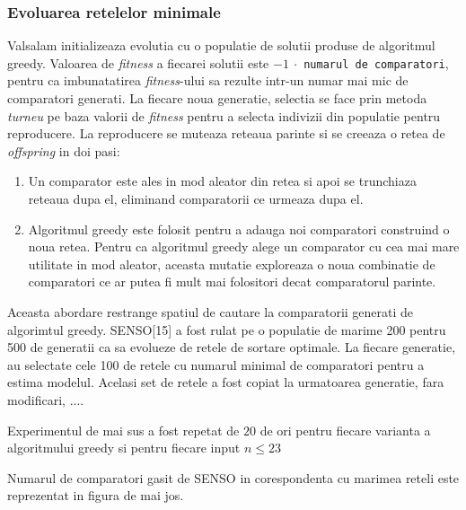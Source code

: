 \documentclass[12pt]{article}
\begin{document}
\subsubsection{Evoluarea retelelor minimale}

Valsalam initializeaza evolutia cu o populatie de solutii produse de algoritmul greedy. Valoarea de \textit{fitness} a fiecarei solutii este $-1 \  \cdot $ \texttt{numarul de comparatori}, pentru ca imbunatatirea \textit{fitness}-ului sa rezulte intr-un numar mai mic de comparatori generati. La fiecare noua generatie, selectia se face prin metoda \textit{turneu} pe baza valorii de \textit{fitness} pentru a selecta indivizii din populatie pentru reproducere. La reproducere se muteaza reteaua parinte si se creeaza o retea de \textit{offspring} in doi pasi:
\begin{enumerate}
	\item Un comparator este ales in mod aleator din retea si apoi se trunchiaza reteaua dupa el, eliminand comparatorii ce urmeaza dupa el.
	\item Algoritmul greedy este folosit pentru a adauga noi comparatori construind o noua retea. Pentru ca algoritmul greedy alege un comparator cu cea mai mare utilitate in mod aleator, aceasta mutatie exploreaza o noua combinatie de comparatori ce ar putea fi mult mai folositori decat comparatorul parinte.
\end{enumerate}
Aceasta abordare restrange spatiul de cautare la comparatorii generati de algorimtul greedy.
SENSO[15] a fost rulat pe o populatie de marime 200 pentru 500 de generatii ca sa evolueze de retele de sortare optimale. La fiecare generatie, au selectate cele 100 de retele cu numarul minimal de comparatori pentru a estima modelul. Acelasi set de retele a fost copiat la urmatoarea generatie, fara modificari, ....

Experimentul de mai sus a fost repetat de $20$ de ori pentru fiecare varianta a algoritmului greedy si pentru fiecare input $n \leq 23$

Numarul de comparatori gasit de SENSO in corespondenta cu marimea reteli este reprezentat in figura de mai jos.
\end{document}

